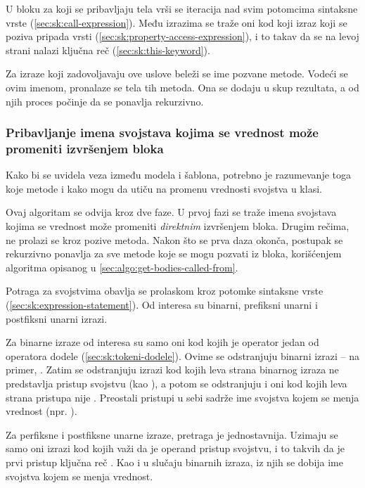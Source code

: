 U bloku za koji se pribavljaju tela vrši se iteracija nad svim potomcima sintaksne vrste  (\cref{sec:sk:call-expression}).
Među izrazima se traže oni kod koji izraz koji se poziva pripada vrsti  (\cref{sec:sk:property-access-expression}), i to takav da se na levoj strani nalazi ključna reč  (\cref{sec:sk:this-keyword}).

Za izraze koji zadovoljavaju ove uslove beleži se ime pozvane metode.
Vodeći se ovim imenom, pronalaze se tela tih metoda.
Ona se dodaju u skup rezultata, a od njih proces počinje da se ponavlja rekurzivno.

\subsubsection{Pribavljanje imena svojstava kojima se vrednost može promeniti izvršenjem bloka}\label{sec:algo:get-prop-names-which-can-be-modified-by}

Kako bi se uvidela veza između modela i šablona, potrebno je razumevanje toga koje metode i kako mogu da utiču na promenu vrednosti svojstva u klasi.

Ovaj algoritam se odvija kroz dve faze.
U prvoj fazi se traže imena svojstava kojima se vrednost može promeniti \emph{direktnim} izvršenjem bloka.
Drugim rečima, ne prolazi se kroz pozive metoda.
Nakon što se prva daza okonča, postupak se rekurzivno ponavlja za sve metode koje se mogu pozvati iz bloka, korišćenjem algoritma opisanog u \cref{sec:algo:get-bodies-called-from}.

Potraga za svojstvima obavlja se prolaskom kroz potomke sintaksne vrste  (\cref{sec:sk:expression-statement}).
Od interesa su binarni, prefiksni unarni i postfiksni unarni izrazi.

Za binarne izraze od interesa su samo oni kod kojih je operator jedan od operatora dodele (\cref{sec:sk:tokeni-dodele}).
Ovime se odstranjuju binarni izrazi -- na primer, .
Zatim se odstranjuju izrazi kod kojih leva strana binarnog izraza ne predstavlja pristup svojstvu (kao ), a potom se odstranjuju i oni kod kojih leva strana pristupa nije .
Preostali pristupi u sebi sadrže ime svojstva kojem se menja vrednost (npr. ).

Za perfiksne i postfiksne unarne izraze, pretraga je jednostavnija.
Uzimaju se samo oni izrazi kod kojih važi da je operand pristup svojstvu, i to takvih da je prvi pristup ključna reč .
Kao i u slučaju binarnih izraza, iz njih se dobija ime svojstva kojem se menja vrednost.

